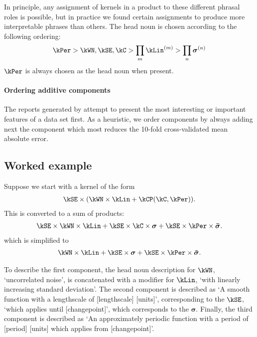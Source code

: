 In principle, any assignment of kernels in a product to these different phrasal roles is possible, but in practice we found certain assignments to produce more interpretable phrases than others.
The head noun is chosen according to the following ordering:
\begin{align*}
\kPer > \kWN, \kSE, \kC > \prod_m \kLin^{(m)} > \prod_n \boldsymbol\sigma^{(n)}
\end{align*}
\ie $\kPer$ is always chosen as the head noun when present.

\paragraph{Ordering additive components}

The reports generated by \procedurename{} attempt to present the most interesting or important features of a data set first.
As a heuristic, we order components by always adding next the component which most reduces the 10-fold cross-validated mean absolute error.

\subsection{Worked example}

Suppose we start with a kernel of the form
\begin{align*}
\kSE \times (\kWN \times \kLin + \kCP(\kC, \kPer)).
\end{align*}
This is converted to a sum of products:
\begin{align*}
\kSE \times \kWN \times \kLin + \kSE \times \kC \times \boldsymbol{\sigma} + \kSE \times \kPer \times \boldsymbol{\bar\sigma}.
\end{align*}
which is simplified to
\begin{align*}
\kWN \times \kLin + \kSE \times \boldsymbol{\sigma} + \kSE \times \kPer \times \boldsymbol{\bar\sigma}.
\end{align*}

To describe the first component, the head noun description for $\kWN$, `uncorrelated noise', is concatenated with a modifier for $\kLin$, `with linearly increasing standard deviation'.
%
The second component is described as `A smooth function with a lengthscale of [lengthscale] [units]', corresponding to the $\kSE$, `which applies until [changepoint]', which corresponds to the $\boldsymbol{\sigma}$.
%
Finally, the third component is described as `An approximately periodic function with a period of [period] [units] which applies from [changepoint]'.

